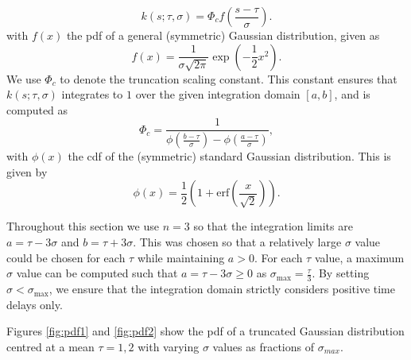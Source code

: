 \begin{equation}
k(s;\tau,\sigma)=\Phi_cf\left(\frac{s-\tau}{\sigma}\right).
\end{equation}
with $f(x)$ the pdf of a general (symmetric) Gaussian distribution, given as
\begin{equation}\label{f}
    f(x)=\frac{1}{\sigma\sqrt{2\pi}}\exp\left(-\frac{1}{2}x^2\right).
\end{equation}
We use $\Phi_c$ to denote the truncation scaling constant. This constant ensures that $k(s;\tau,\sigma)$ integrates to $1$ over the given integration domain $[a,b]$, and is computed as
\begin{equation}
    \Phi_c=\frac{1}{\phi\left(\frac{b-\tau}{\sigma}\right)-\phi\left(\frac{a-\tau}{\sigma}\right)},
\end{equation}
with $\phi(x)$ the cdf of the (symmetric) standard Gaussian distribution. This is given by
\begin{equation}\label{phi}
    \phi(x)=\frac{1}{2}\left(1+\text{erf}\left(\frac{x}{\sqrt{2}}\right)\right).
\end{equation}

Throughout this section we use $n=3$ so that the integration limits are $a=\tau-3\sigma$ and $b=\tau+3\sigma$. This was chosen so that a relatively large $\sigma$ value could be chosen for each $\tau$ while maintaining $a>0$. For each $\tau$ value, a maximum $\sigma$ value can be computed such that $a=\tau-3\sigma\geq0$ as $\sigma_{\max}=\frac{\tau}{3}$. By setting $\sigma<\sigma_{\max}$, we ensure that the integration domain strictly considers positive time delays only.

Figures \ref{fig:pdf1} and \ref{fig:pdf2} show the pdf of a truncated Gaussian distribution centred at a mean $\tau=1,2$ with varying $\sigma$ values as fractions of $\sigma_{max}$.

